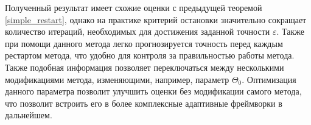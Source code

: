     Полученный результат имеет схожие оценки с предыдущей теоремой \ref{simple_restart}, однако на практике критерий остановки значительно сокращает количество итераций, необходимых для достижения заданной точности $\varepsilon$. Также при помощи данного метода легко прогнозируется точность перед каждым рестартом метода, что удобно для контроля за правильностью работы метода. Также подобная информация позволяет переключаться между несколькими модификациями метода, изменяющими, например, параметр $\Theta_0$. Оптимизация данного параметра позволит улучшить оценки без модификации самого метода, что позволит встроить его в более комплексные адаптивные фреймворки в дальнейшем. 
\FloatBarrier